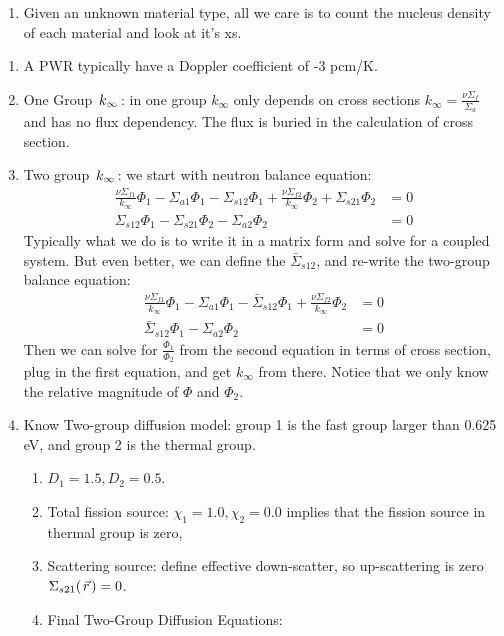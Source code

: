 \documentclass{school-22.211-notes}
\begin{document}
\begin{enumerate}
\item Given an unknown material type, all we care is to count the nucleus density of each material and look at it's xs. 
\end{enumerate}


\clearpage
{} 
\begin{enumerate}
\item A PWR typically have a Doppler coefficient of -3 pcm/K. 

\item One Group $\left. k_{\infty} \right.$: in one group $k_{\infty}$ only depends on cross sections $k_{\infty} = \frac{\nu \Sigma_f}{\Sigma_a}$ and has no flux dependency. The flux is buried in the calculation of cross section.

\item Two group $\left. k_{\infty} \right.$: we start with neutron balance equation:
  \begin{align}
    \frac{\nu \Sigma_{f1}}{k_{\infty}} \Phi_1 - \Sigma_{a1} \Phi_1 - \Sigma_{s12} \Phi_1 + \frac{\nu \Sigma_{f2}}{k_{\infty}} \Phi_2 + \Sigma_{s21} \Phi_2 &= 0 \\
\Sigma_{s12} \Phi_1 - \Sigma_{s21} \Phi_2 - \Sigma_{a2} \Phi_2 &= 0 
  \end{align}
  Typically what we do is to write it in a matrix form and solve for a coupled system. But even better, we can define the  $\bar{\Sigma}_{s12}$, and re-write the two-group balance equation: 
  \begin{align}
    \frac{\nu \Sigma_{f1}}{k_{\infty}} \Phi_1 - \Sigma_{a1} \Phi_1 - \bar{\Sigma}_{s12} \Phi_1 + \frac{\nu \Sigma_{f2}}{k_{\infty}} \Phi_2 &= 0 \\
    \bar{\Sigma}_{s12} \Phi_1- \Sigma_{a2} \Phi_2 &= 0 
  \end{align}
  Then we can solve for $\frac{\Phi_1}{\Phi_2}$ from the second equation in terms of cross section, plug in the first equation, and get $k_{\infty}$ from there. Notice that we only know the relative magnitude of $\Phi$ and $\Phi_2$. 

\item Know Two-group diffusion model: group 1 is the fast group larger than 0.625 eV, and group 2 is the thermal group. 
\begin{enumerate}
\item $D_1 = 1.5, D_2 = 0.5$.
\item Total fission source: $\chi_1 = 1.0, \chi_2 = 0.0$ implies that the fission source in thermal group is zero,
\item Scattering source: define effective down-scatter, so up-scattering is zero $\Sigma_{s21} (\left.\vec{r}\right.) = 0$. 
\item Final Two-Group Diffusion Equations: 
\end{enumerate}


\end{enumerate}
\end{document}
